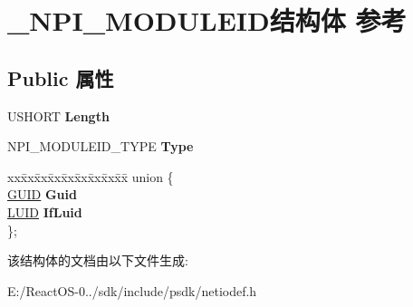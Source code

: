 \hypertarget{struct___n_p_i___m_o_d_u_l_e_i_d}{}\section{\+\_\+\+N\+P\+I\+\_\+\+M\+O\+D\+U\+L\+E\+I\+D结构体 参考}
\label{struct___n_p_i___m_o_d_u_l_e_i_d}
\subsection*{Public 属性}
\begin{DoxyCompactItemize}
\item 
\mbox{\label{struct___n_p_i___m_o_d_u_l_e_i_d_a0717e63bddbd0463cf7cf88fdc111599}} 
U\+S\+H\+O\+RT {\bfseries Length}
\item 
\mbox{\label{struct___n_p_i___m_o_d_u_l_e_i_d_af29adc32ae055025dc2943c2f5e4b4a3}} 
N\+P\+I\+\_\+\+M\+O\+D\+U\+L\+E\+I\+D\+\_\+\+T\+Y\+PE {\bfseries Type}
\item 
\mbox{\label{struct___n_p_i___m_o_d_u_l_e_i_d_acd3873998a7c44277870688bf1f2ccc8}} 
\begin{tabbing}
xx\=xx\=xx\=xx\=xx\=xx\=xx\=xx\=xx\=\kill
union \{\\
\>\hyperlink{interface_g_u_i_d}{GUID} {\bfseries Guid}\\
\>\hyperlink{struct___l_u_i_d}{LUID} {\bfseries IfLuid}\\
\}; \\

\end{tabbing}\end{DoxyCompactItemize}


该结构体的文档由以下文件生成\+:\begin{DoxyCompactItemize}
\item 
E\+:/\+React\+O\+S-\/0../sdk/include/psdk/netiodef.\+h\end{DoxyCompactItemize}
